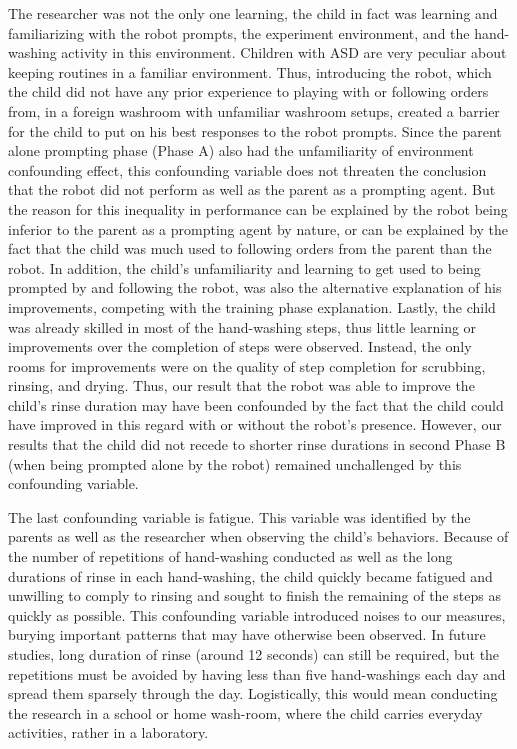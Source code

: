 The researcher was not the only one learning, the child in fact was learning and familiarizing with the robot prompts, the experiment environment, and the hand-washing activity in this environment.  Children with ASD are very peculiar about keeping routines in a familiar environment.  Thus, introducing the robot, which the child did not have any prior experience to playing with or following orders from, in a foreign washroom with unfamiliar washroom setups, created a barrier for the child to put on his best responses to the robot prompts.  Since the parent alone prompting phase (Phase A) also had the unfamiliarity of environment confounding effect, this confounding variable does not threaten the conclusion that the robot did not perform as well as the parent as a prompting agent.  But the reason for this inequality in performance can be explained by the robot being inferior to the parent as a prompting agent by nature, or can be explained by the fact that the child was much used to following orders from the parent than the robot.  In addition, the child's unfamiliarity and learning to get used to being prompted by and following the robot, was also the alternative explanation of his improvements, competing with the training phase explanation.  Lastly, the child was already skilled in most of the hand-washing steps, thus little learning or improvements over the completion of steps were observed.  Instead, the only rooms for improvements were on the quality of step completion for scrubbing, rinsing, and drying.  Thus, our result that the robot was able to improve the child's rinse duration may have been confounded by the fact that the child could have improved in this regard with or without the robot's presence.  However, our results that the child did not recede to shorter rinse durations in second Phase B (when being prompted alone by the robot) remained unchallenged by this confounding variable.

The last confounding variable is fatigue.  This variable was identified by the parents as well as the researcher when observing the child's behaviors.  Because of the number of repetitions of hand-washing conducted as well as the long durations of rinse in each hand-washing, the child quickly became fatigued and unwilling to comply to rinsing and sought to finish the remaining of the steps as quickly as possible.  This confounding variable introduced noises to our measures, burying important patterns that may have otherwise been observed.  In future studies, long duration of rinse (around 12 seconds) can still be required, but the repetitions must be avoided by having less than five hand-washings each day and spread them sparsely through the day.  Logistically, this would mean conducting the research in a school or home wash-room, where the child carries everyday activities, rather in a laboratory.

